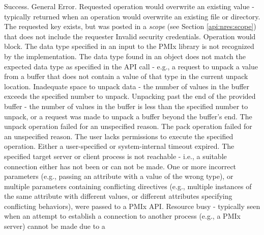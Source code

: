 \begin{constantdesc}
%
Success.
%
General Error.
%
Requested operation would overwrite an existing value - typically returned
when an operation would overwrite an existing file or directory.
%
The requested key exists, but was posted in a \emph{scope} (see Section \ref{api:nres:scope}) that does not include the requester
%
Invalid security credentials.
%
Operation would block.
%
The data type specified in an input to the \ac{PMIx} library is not recognized
by the implementation.
%
The data type found in an object does not match the expected data type
as specified in the \ac{API} call - e.g., a request to unpack a
 value from a buffer that does not contain a value of
that type in the current unpack location.
%
Inadequate space to unpack data - the number of values in the buffer exceeds
the specified number to unpack.
%
Unpacking past the end of the provided buffer - the number of values in the
buffer is less than the specified number to unpack, or a request was made to
unpack a buffer beyond the buffer's end.
%
The unpack operation failed for an unspecified reason.
%
The pack operation failed for an unspecified reason.
%
The user lacks permissions to execute the specified operation.
%
Either a user-specified or system-internal timeout expired.
%
The specified target server or client process is not reachable - i.e., a
suitable connection either has not been or can not be made.
%
One or more incorrect parameters (e.g., passing an attribute with a value of the wrong type), or multiple parameters containing conflicting directives (e.g., multiple instances of the same attribute with different values, or different attributes specifying conflicting behaviors), were passed to a \ac{PMIx} \ac{API}.
%
Resource busy - typically seen when an attempt to establish a connection
to another process (e.g., a \ac{PMIx} server) cannot be made due to a

\end{constantdesc}
